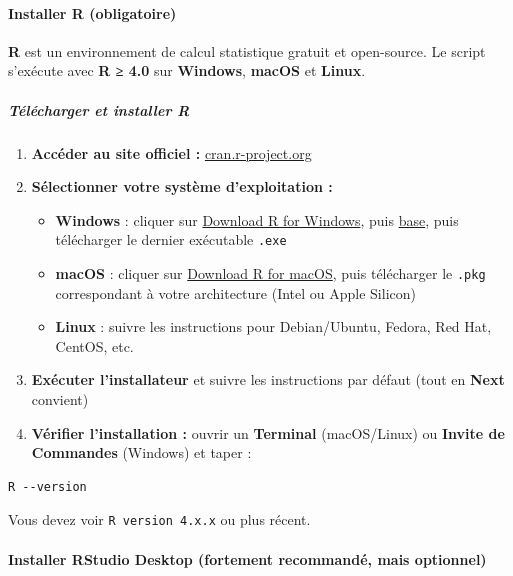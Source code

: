 \paragraph{Installer R (obligatoire)}\label{installer-r-obligatoire}

\textbf{R} est un environnement de calcul statistique gratuit et
open-source. Le script s'exécute avec \textbf{R ≥ 4.0} sur
\textbf{Windows}, \textbf{macOS} et \textbf{Linux}.

\subparagraph{Télécharger et installer
R}\label{tuxe9luxe9charger-et-installer-r}

\begin{enumerate}
\def\labelenumi{\arabic{enumi}.}
\tightlist
\item
  \textbf{Accéder au site officiel :}
  \href{https://cran.r-project.org}{cran.r-project.org}
\item
  \textbf{Sélectionner votre système d'exploitation :}

  \begin{itemize}
  \tightlist
  \item
    \textbf{Windows} : cliquer sur
    \href{https://cran.r-project.org/bin/windows/}{Download R for
    Windows}, puis
    \href{https://cran.r-project.org/bin/windows/base/}{base}, puis
    télécharger le dernier exécutable \texttt{.exe}
  \item
    \textbf{macOS} : cliquer sur
    \href{https://cran.r-project.org/bin/macosx/}{Download R for macOS},
    puis télécharger le \texttt{.pkg} correspondant à votre architecture
    (Intel ou Apple Silicon)
  \item
    \textbf{Linux} : suivre les instructions pour Debian/Ubuntu, Fedora,
    Red Hat, CentOS, etc.
  \end{itemize}
\item
  \textbf{Exécuter l'installateur} et suivre les instructions par défaut
  (tout en \textbf{Next} convient)
\item
  \textbf{Vérifier l'installation :} ouvrir un \textbf{Terminal}
  (macOS/Linux) ou \textbf{Invite de Commandes} (Windows) et taper :
\end{enumerate}

\begin{verbatim}
R --version
\end{verbatim}

Vous devez voir \texttt{R\ version\ 4.x.x} ou plus récent.

\paragraph{Installer RStudio Desktop (fortement recommandé, mais
optionnel)}\label{installer-rstudio-desktop-fortement-recommanduxe9-mais-optionnel}

